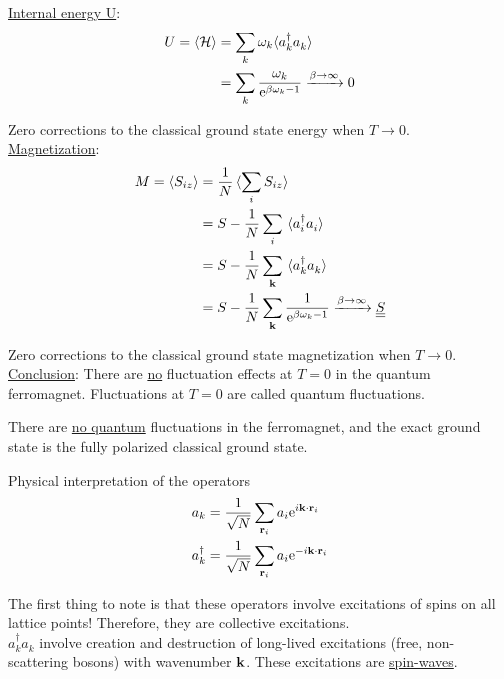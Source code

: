 \uline{Internal energy U}:
\begin{align}
    U = \langle \mathcal{H} \rangle &= \sum_k \omega_k \langle a_k^\dagger a_k^{} \rangle \\
    &= \sum_k \frac{\omega_k}{\mathrm{e}^{\beta \omega_k - 1 }} \xrightarrow{\beta \rightarrow \infty} 0 
\end{align}

Zero corrections to the classical ground state energy when $T \rightarrow 0$. \\

\uline{Magnetization}:
\begin{align}
    M = 
    \ev{S_{iz}}&= \frac{1}{N} \ev*{\sum_i S_{iz}} \\
    &= S - \frac{1}{N} \sum_i \ev*{a_i^\dagger a_i^{}}\\
    &= S - \frac{1}{N} \sum_{\vb{k}} \ev*{a_k^\dagger a_k^{}} \\
    &= S - \frac{1}{N} \sum_{\vb{k}} \frac{1}{\e^{\beta \omega_k - 1}} \xrightarrow{\beta \rightarrow \infty} \uline{\uline{ S }}
\end{align}

Zero corrections to the classical ground state magnetization when $T \rightarrow 0$. \\

 \uline{Conclusion}: There are \uline{no} fluctuation effects at $T = 0$ in the quantum ferromagnet. Fluctuations at $T = 0$ are called quantum fluctuations.

\begin{tcolorbox}
    There are \uline{no quantum} fluctuations in the ferromagnet, and the exact ground state is the fully polarized classical ground state.
\end{tcolorbox}

Physical interpretation of the operators
\begin{align}
    a_k &= \frac{1}{\sqrt{N}}\sum_{\vb{r}_i}a_i \mathrm{e}^{i \vb{k} \cdot \vb{r}_i} \\
    a_k^\dagger &= \frac{1}{\sqrt{N}}\sum_{\vb{r}_i}a_i \mathrm{e}^{-i \vb{k} \cdot \vb{r}_i}
\end{align}

The first thing to note is that these operators involve excitations of spins on all lattice points! Therefore, they are collective excitations. \\
 $a_k^\dagger a_k^{}$ involve creation and destruction of long-lived excitations (free, non-scattering bosons) with wavenumber $\vb{k}$. These excitations are \uline{spin-waves}. \\

